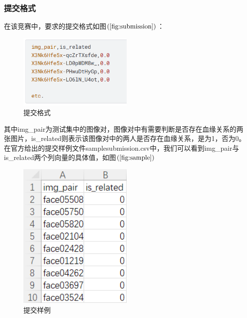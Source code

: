 \documentclass[UTF8]{ctexart}
\begin{document}
\subsubsection{提交格式} 
在该竞赛中，要求的提交格式如图$\left(\ref{fig:submission}\right)$：
\begin{figure}[!ht]
  \centering
  \includegraphics[width=0.5\textwidth]{submission.png}
  \caption{提交格式}
  \label{fig:submission}
\end{figure}

其中img\_pair为测试集中的图像对，图像对中有需要判断是否存在血缘关系的两张图片，is\_related则表示该图像对中的两人是否存在血缘关系，是为1，否为0。在官方给出的提交样例文件sample\underline{\space}submission.csv中，我们可以看到img\_pair与is\_related两个列向量的具体值，如图$\left(\ref{fig:sample}\right)$
\begin{figure}[!ht]
  \centering
  \includegraphics[width=0.5\textwidth]{sample.png}
  \caption{提交样例}
  \label{fig:sample}
\end{figure}
\end{document}
